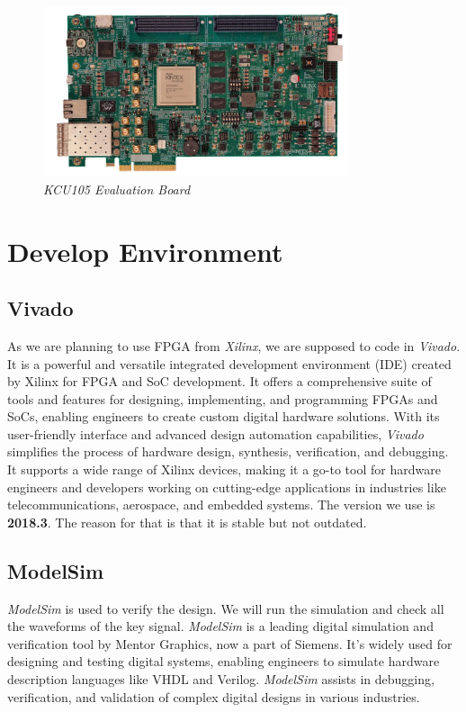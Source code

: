 \begin{figure}[!htbp]
    \centering
    \includegraphics[width=0.8\textwidth]{_IMAGES/KCU105_evaluation_board.png}
    \caption{\textit{KCU105 Evaluation Board}}
    \label{fig:kcu105}
\end{figure}

\section{Develop Environment}
\subsection{Vivado}
As we are planning to use FPGA from \textit{Xilinx}, we are supposed to code in \textit{Vivado}. It is a powerful and versatile integrated development environment (IDE) created by Xilinx for FPGA and SoC development. It offers a comprehensive suite of tools and features for designing, implementing, and programming FPGAs and SoCs, enabling engineers to create custom digital hardware solutions. With its user-friendly interface and advanced design automation capabilities, \textit{Vivado} simplifies the process of hardware design, synthesis, verification, and debugging. It supports a wide range of Xilinx devices, making it a go-to tool for hardware engineers and developers working on cutting-edge applications in industries like telecommunications, aerospace, and embedded systems. The version we use is \textbf{2018.3}. The reason for that is that it is stable but not outdated.

\subsection{ModelSim}
\textit{ModelSim} is used to verify the design. We will run the simulation and check all the waveforms of the key signal. \textit{ModelSim} is a leading digital simulation and verification tool by Mentor Graphics, now a part of Siemens. It's widely used for designing and testing digital systems, enabling engineers to simulate hardware description languages like VHDL and Verilog. \textit{ModelSim} assists in debugging, verification, and validation of complex digital designs in various industries.

